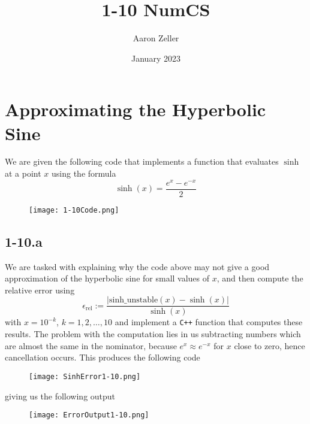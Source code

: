\documentclass{article}
\title{1-10 NumCS}
\author{Aaron Zeller}
\date{January 2023}
\begin{document}
\section*{Approximating the Hyperbolic Sine}
We are given the following code that implements a function that evaluates $\sinh$ at a point $x$ using the formula
\begin{equation*}
\sinh\left(x\right) = \frac{e^{x}-e^{-x}}{2}
\end{equation*}

\begin{figure}[!hbt]
    \centering
\texttt{[image: 1-10Code.png]}

\end{figure}
\subsection*{1-10.a}
We are tasked with explaining why the code above may not give a good approximation of the hyperbolic sine for small values of $x$, and then compute the relative error using
\begin{equation*}
    \epsilon_{\text{rel}} := \frac{\left
    \lvert \mathrm{sinh\_unstable}\left(x\right) - \sinh\left(x\right)\right\rvert}{\sinh\left(x\right)}
\end{equation*}
with $x = 10^{-k}$, $k = 1,2, \dots, 10$ and implement a \verb|C++| function that computes these results. The problem with the computation lies in us subtracting numbers which are almost the same in the nominator, because $e^{x} \approx e^{-x}$ for $x$ close to zero, hence cancellation occurs. This produces the following code
\begin{figure}[!hbt]
    \centering
\texttt{[image: SinhError1-10.png]}
\end{figure}

\pagebreak

\noindent giving us the following output

\begin{figure}[!hbt]
    \centering
\texttt{[image: ErrorOutput1-10.png]}
\end{figure}
\end{document}
